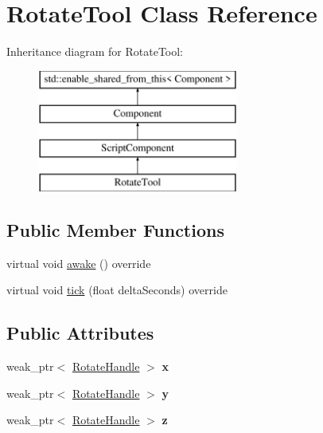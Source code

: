 \hypertarget{class_rotate_tool}{}\section{Rotate\+Tool Class Reference}
\label{class_rotate_tool}
Inheritance diagram for Rotate\+Tool\+:\begin{figure}[H]
\begin{center}
\leavevmode
\includegraphics[height=4.000000cm]{class_rotate_tool}
\end{center}
\end{figure}
\subsection*{Public Member Functions}
\begin{DoxyCompactItemize}
\item 
virtual void \hyperlink{class_rotate_tool_af476de7866d44808efd35fe431710049}{awake} () override
\item 
virtual void \hyperlink{class_rotate_tool_a59f02b0a16d0fa6c48a8cf6d2e1fcd70}{tick} (float delta\+Seconds) override
\end{DoxyCompactItemize}
\subsection*{Public Attributes}
\begin{DoxyCompactItemize}
\item 
\hypertarget{class_rotate_tool_a475eb6b578e6fd75dc3be68e70198f1e}{}weak\+\_\+ptr$<$ \hyperlink{class_rotate_handle}{Rotate\+Handle} $>$ {\bfseries x}\label{class_rotate_tool_a475eb6b578e6fd75dc3be68e70198f1e}

\item 
\hypertarget{class_rotate_tool_a36dfc4f3d203b4039b31241a4ad7d0ef}{}weak\+\_\+ptr$<$ \hyperlink{class_rotate_handle}{Rotate\+Handle} $>$ {\bfseries y}\label{class_rotate_tool_a36dfc4f3d203b4039b31241a4ad7d0ef}

\item 
\hypertarget{class_rotate_tool_a3e3b6ffbfb8847fef9032da108a016af}{}weak\+\_\+ptr$<$ \hyperlink{class_rotate_handle}{Rotate\+Handle} $>$ {\bfseries z}\label{class_rotate_tool_a3e3b6ffbfb8847fef9032da108a016af}

\end{DoxyCompactItemize}
